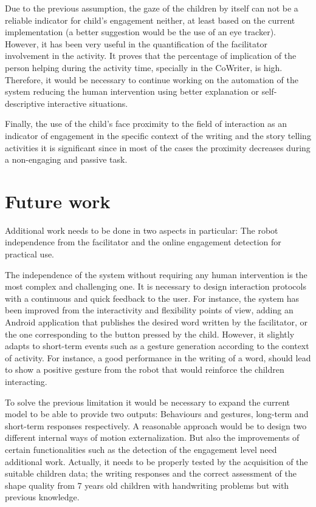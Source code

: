 Due to the previous assumption, the gaze of the children by itself can not be a reliable indicator for child's engagement neither, at least based on the current implementation (a better suggestion would be the use of an eye tracker). However, it has been very useful in the quantification of the facilitator involvement in the activity. It proves that the percentage of implication of the person helping during the activity time, specially in the CoWriter, is high. Therefore, it would be necessary to continue working on the automation of the system reducing the human intervention using better explanation or self-descriptive interactive situations.

Finally, the use of the child's face proximity to the field of interaction as an indicator of engagement in the specific context of the writing and the story telling activities it is significant since in most of the cases the proximity decreases during a non-engaging and passive task.

\section{Future work}

Additional work needs to be done in two aspects in particular: The robot independence from the facilitator and the online engagement detection for practical use.  

The independence of the system without requiring any human intervention is the most complex and challenging one. It is necessary to design interaction protocols with a continuous and quick feedback to the user. For instance, the system has been improved from the interactivity and flexibility points of view, adding an Android application that publishes the desired word written by the facilitator, or the one corresponding to the button pressed by the child. However, it slightly adapts to short-term events such as a gesture generation according to the context of activity. For instance, a good performance in the writing of a word, should lead to show a positive gesture from the robot that would reinforce the children interacting.

To solve the previous limitation it would be necessary to expand the current model to be able to provide two outputs: Behaviours and gestures, long-term and short-term responses respectively. A reasonable approach would be to design two different internal ways of motion externalization. But also the improvements of certain functionalities such as the detection of the engagement level need additional work. Actually, it needs to be properly tested by the acquisition of the suitable children data; the writing responses and the correct assessment of the shape quality from 7 years old children with handwriting problems but with previous knowledge.

